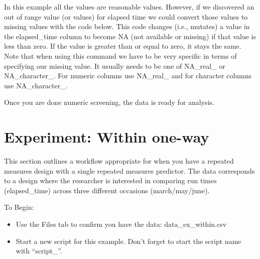 \documentclass[
]{krantz}
\makeatletter
\newenvironment{Shaded}{\begin{snugshade}}{\end{snugshade}}
\newcommand{\DataTypeTok}[1]{\textcolor[rgb]{0.27,0.27,0.27}{#1}}
\newcommand{\DecValTok}[1]{\textcolor[rgb]{0.06,0.06,0.06}{#1}}
\newcommand{\KeywordTok}[1]{\textcolor[rgb]{0.27,0.27,0.27}{\textbf{#1}}}
\newcommand{\NormalTok}[1]{#1}
\newcommand{\OperatorTok}[1]{\textcolor[rgb]{0.43,0.43,0.43}{\textbf{#1}}}
\newcommand{\OtherTok}[1]{\textcolor[rgb]{0.37,0.37,0.37}{#1}}
\newcommand{\StringTok}[1]{\textcolor[rgb]{0.5,0.5,0.5}{#1}}
\newenvironment{kframe}{%
\medskip{}
\setlength{\fboxsep}{.8em}
 \def\at@end@of@kframe{}%
 \ifinner\ifhmode%
  \def\at@end@of@kframe{\end{minipage}}%
  \begin{minipage}{\columnwidth}%
 \fi\fi%
 \def\FrameCommand##1{\hskip\@totalleftmargin \hskip-\fboxsep
 \colorbox{shadecolor}{##1}\hskip-\fboxsep
     \hskip-\linewidth \hskip-\@totalleftmargin \hskip\columnwidth}%
 \MakeFramed {\advance\hsize-\width
   \@totalleftmargin\z@ \linewidth\hsize
   \@setminipage}}%
 {\par\unskip\endMakeFramed%
 \at@end@of@kframe}
\renewenvironment{Shaded}{\begin{kframe}}{\end{kframe}}
\makeatother
\begin{document}
In this example all the values are reasonable values. However, if we discovered an out of range value (or values) for elapsed time we could convert those values to missing values with the code below. This code changes (i.e., mutates) a value in the elapsed\_time column to become NA (not available or missing) if that value is less than zero. If the value is greater than or equal to zero, it stays the same. Note that when using this command we have to be very specific in terms of specifying our missing value. It usually needs to be one of NA\_real\_ or NA\_character\_. For numeric columns use NA\_real\_ and for character columns use NA\_character\_.

\begin{Shaded}
\end{Shaded}

Once you are done numeric screening, the data is ready for analysis.

\hypertarget{experiment-within-one-way}{%
\section{Experiment: Within one-way}\label{experiment-within-one-way}}

This section outlines a workflow appropriate for when you have a repeated measures design with a single repeated measures predictor. The data corresponds to a design where the researcher is interested in comparing run times (elapsed\_time) across three different occasions (march/may/june).

To Begin:

\begin{itemize}
\item
  Use the Files tab to confirm you have the data: data\_ex\_within.csv
\item
  Start a new script for this example. Don't forget to start the script name with ``script\_''.
\end{itemize}
\end{document}
